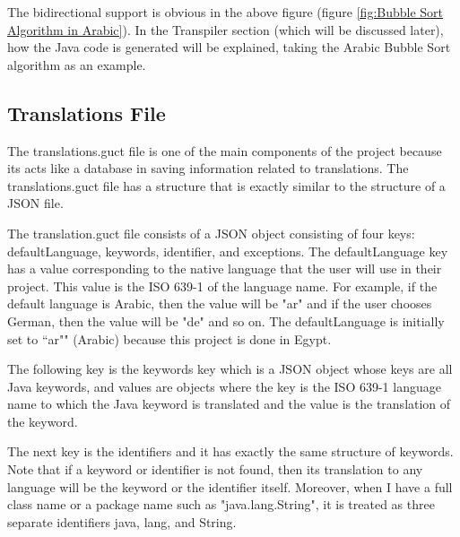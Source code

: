The bidirectional support is obvious in the above figure (figure \ref{fig:Bubble Sort Algorithm in Arabic}). In the Transpiler section (which will be discussed later), how the Java code is generated will be explained, taking the Arabic Bubble Sort algorithm as an example.

\subsection{Translations File}
The translations.guct file is one of the main components of the project because its acts like a database in saving information related to translations. The translations.guct file has a structure that is exactly similar to the structure of a JSON file. 

The translation.guct file consists of a JSON object consisting of four keys: defaultLanguage, keywords, identifier, and exceptions. The defaultLanguage key has a value corresponding to the native language that the user will use in their project. This value is the ISO 639-1 of the language name. For example, if the default language is Arabic, then the value will be "ar" and if the user chooses German, then the value will be "de" and so on. The defaultLanguage is initially set to ``ar"" (Arabic) because this project is done in Egypt.

The following key is the keywords key which is a JSON object whose keys are all Java keywords, and values are objects where the key is the ISO 639-1 language name to which the Java keyword is translated and the value is the translation of the keyword. 

The next key is the identifiers and it has exactly the same structure of keywords. Note that if a keyword or identifier is not found, then its translation to any language will be the keyword or the identifier itself. Moreover, when I have a full class name or a package name such as "java.lang.String", it is treated as three separate identifiers java, lang, and String.

